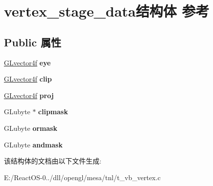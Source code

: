 \hypertarget{structvertex__stage__data}{}\section{vertex\+\_\+stage\+\_\+data结构体 参考}
\label{structvertex__stage__data}
\subsection*{Public 属性}
\begin{DoxyCompactItemize}
\item 
\mbox{\label{structvertex__stage__data_a1c7230149671fd02574e0f8d2c14bb5c}} 
\hyperlink{struct_g_lvector4f}{G\+Lvector4f} {\bfseries eye}
\item 
\mbox{\label{structvertex__stage__data_a887e750ddd524f427fc4d7f6112e9d49}} 
\hyperlink{struct_g_lvector4f}{G\+Lvector4f} {\bfseries clip}
\item 
\mbox{\label{structvertex__stage__data_a25a50e02f890cfc4baa4550660d08b44}} 
\hyperlink{struct_g_lvector4f}{G\+Lvector4f} {\bfseries proj}
\item 
\mbox{\label{structvertex__stage__data_a4dd8e145671384c4b5f36eb222c75a9a}} 
G\+Lubyte $\ast$ {\bfseries clipmask}
\item 
\mbox{\label{structvertex__stage__data_a17d64122365b9a997597ec0db8b9a230}} 
G\+Lubyte {\bfseries ormask}
\item 
\mbox{\label{structvertex__stage__data_a5b9d71dfd6e035fc25c4378eee518afe}} 
G\+Lubyte {\bfseries andmask}
\end{DoxyCompactItemize}


该结构体的文档由以下文件生成\+:\begin{DoxyCompactItemize}
\item 
E\+:/\+React\+O\+S-\/0../dll/opengl/mesa/tnl/t\+\_\+vb\+\_\+vertex.\+c\end{DoxyCompactItemize}
